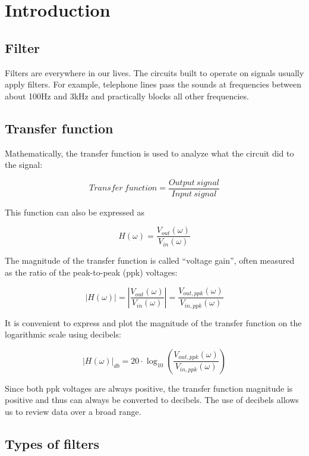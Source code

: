 \documentclass{article}
\begin{document}
\section{Introduction}

\subsection{Filter}
Filters are everywhere in our lives. The circuits built to operate on signals usually apply filters. For example, telephone lines pass the sounds at frequencies between about 100Hz and 3kHz and practically blocks all other frequencies.

\subsection{Transfer function}
Mathematically, the transfer function is used to analyze what the circuit did to the signal:

$$Transfer\ function=\frac{Output\ signal}{Input\ signal}$$

This function can also be expressed as

$$H(\omega)=\frac{V_{out}(\omega)}{V_{in}(\omega)}$$

The magnitude of the transfer function is called “voltage gain”, often measured as the ratio of the peak-to-peak (ppk) voltages:

$$|H(\omega)|=\left|\frac{V_{out}(\omega)}{V_{in}(\omega)}\right|=\frac{V_{out,ppk}(\omega)}{V_{in,ppk}(\omega)}$$

It is convenient to express and plot the magnitude of the transfer function on the logarithmic scale using decibels:

$$|H(\omega)|_{db}=20\cdot\log_10\left(\frac{V_{out,ppk}(\omega)}{V_{in,ppk}(\omega)}\right)$$

Since both ppk voltages are always positive, the transfer function magnitude is positive and thus can always be converted to decibels. The use of decibels allows us to review data over a broad range.

\newpage

\subsection{Types of filters}
\end{document}
